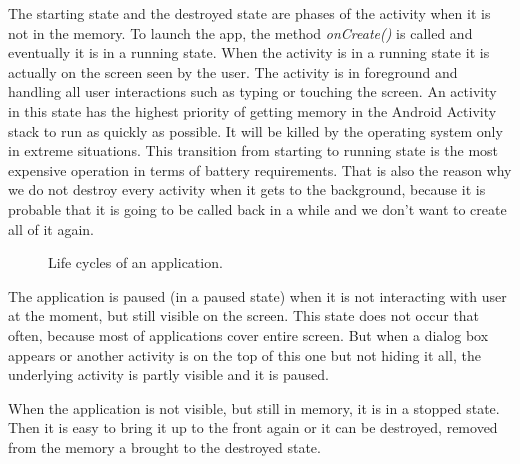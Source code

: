 The starting state and the destroyed state are phases of the activity when it is not in the memory.
To launch the app, the method \emph{onCreate()} is called and eventually it is in a running state.
When the activity is in a running state it is actually on the screen seen by the user.
The activity is in foreground and handling all user interactions such as typing or touching the screen.
An activity in this state has the highest priority of getting memory in the Android Activity stack to run as quickly as possible.
It will be killed by the operating system only in extreme situations.
This transition from starting to running state is the most expensive operation in terms of battery requirements.
That is also the reason why we do not destroy every activity when it gets to the background, 
because it is probable that it is going to be called back in a while and we don't want to create all of it again.

\begin{figure}[h!]
    \caption{Life cycles of an application.}
\end{figure}

The application is paused (in a paused state) when it is not interacting with user at the moment, but still visible on the screen.
This state does not occur that often, because most of applications cover entire screen.
But when a dialog box appears or another activity is on the top of this one but not hiding it all, the underlying activity is partly visible and it is paused.

When the application is not visible, but still in memory, it is in a stopped state.
Then it is easy to bring it up to the front again or it can be destroyed, removed from the memory a brought to the destroyed state.

